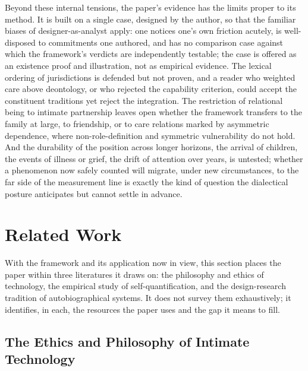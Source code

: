 Beyond these internal tensions, the paper's evidence has the limits proper to its method. It is built on a single case, designed by the author, so that the familiar biases of designer-as-analyst apply: one notices one's own friction acutely, is well-disposed to commitments one authored, and has no comparison case against which the framework's verdicts are independently testable; the case is offered as an existence proof and illustration, not as empirical evidence. The lexical ordering of jurisdictions is defended but not proven, and a reader who weighted care above deontology, or who rejected the capability criterion, could accept the constituent traditions yet reject the integration. The restriction of relational being to intimate partnership leaves open whether the framework transfers to the family at large, to friendship, or to care relations marked by asymmetric dependence, where non-role-definition and symmetric vulnerability do not hold. And the durability of the position across longer horizons, the arrival of children, the events of illness or grief, the drift of attention over years, is untested; whether a phenomenon now safely counted will migrate, under new circumstances, to the far side of the measurement line is exactly the kind of question the dialectical posture anticipates but cannot settle in advance.

\section{Related Work}\label{p01:sec:related}

With the framework and its application now in view, this section places the paper within three literatures it draws on: the philosophy and ethics of technology, the empirical study of self-quantification, and the design-research tradition of autobiographical systems. It does not survey them exhaustively; it identifies, in each, the resources the paper uses and the gap it means to fill.

\subsection{The Ethics and Philosophy of Intimate Technology}


